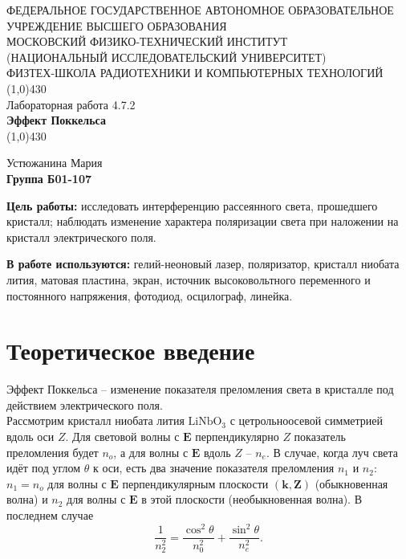 \documentclass[11pt]{article}
\begin{document}
\begin{titlepage}
\begin{center}
\large{\small ФЕДЕРАЛЬНОЕ ГОСУДАРСТВЕННОЕ АВТОНОМНОЕ ОБРАЗОВАТЕЛЬНОЕ\\ УЧРЕЖДЕНИЕ ВЫСШЕГО ОБРАЗОВАНИЯ\\ МОСКОВСКИЙ ФИЗИКО-ТЕХНИЧЕСКИЙ ИНСТИТУТ\\ (НАЦИОНАЛЬНЫЙ ИССЛЕДОВАТЕЛЬСКИЙ УНИВЕРСИТЕТ)\\ ФИЗТЕХ-ШКОЛА РАДИОТЕХНИКИ И КОМПЬЮТЕРНЫХ ТЕХНОЛОГИЙ}
\vfill
\line(1,0){430}\\[1mm]
\huge{Лабораторная работа 4.7.2}\\
\huge\textbf{Эффект Поккельса}\\
\line(1,0){430}\\[1mm]
\vfill
\begin{flushright}
\normalsize{Устюжанина Мария}\\
\normalsize{\textbf{Группа Б01-107}}\\
\end{flushright}
\end{center}
\end{titlepage}

\par \textbf{Цель работы:} исследовать интерференцию рассеянного света, прошедшего кристалл; наблюдать изменение характера поляризации
света при наложении на кристалл электрического поля.

\par \textbf{В работе используются:} гелий-неоновый лазер, поляризатор, кристалл ниобата лития, матовая пластина, экран, источник высоковольтного переменного и постоянного напряжения, фотодиод, осцилограф, линейка.


\section{Теоретическое введение}
  
Эффект Поккельса -- изменение показателя преломления света в кристалле под действием электрического поля.\\
Рассмотрим кристалл ниобата лития $\text{LiNbO}_3$ с цетрольноосевой симметрией вдоль оси $Z$. Для световой волны с $\mathbf{E}$ перпендикулярно $Z$ показатель преломления будет $n_o$, а для волны с $\mathbf{E}$ вдоль $Z$ -- $n_e$. В случае, когда луч света идёт под углом $\theta$ к оси, есть два значение показателя преломления $n_1$ и $n_2$: $n_1 = n_o$ для волны с $\mathbf{E}$ перпендикулярным плоскости $(\mathbf{k},\mathbf{Z})$ (обыкновенная волна) и $n_2$ для волны с $\mathbf{E}$ в этой плоскости (необыкновенная волна). В последнем случае
\begin{equation}
\dfrac{1}{n_2^2}=\dfrac{\cos^2 \theta}{n_0^2}+\dfrac{\sin^2 \theta}{n_e^2}.
\end{equation}
\end{document}
